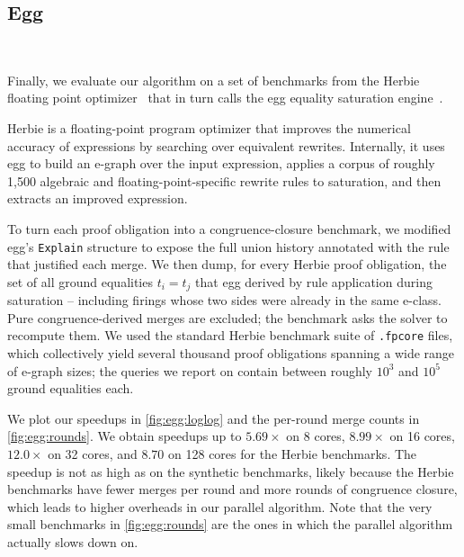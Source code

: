 

\subsection{Egg}~\label{sec:eval:egg}

Finally, we evaluate our algorithm on a set of benchmarks from the Herbie floating point optimizer~\cite{herbie} that in turn calls the egg equality saturation
engine~\cite{egg}.

Herbie is a floating-point program optimizer that improves the numerical
accuracy of expressions by searching over equivalent rewrites. Internally, it
uses egg to build an e-graph over the input expression, applies a corpus of
roughly 1{,}500 algebraic and floating-point-specific rewrite rules to
saturation, and then extracts an improved expression. 

To turn each proof obligation into a congruence-closure benchmark, we modified
egg's \texttt{Explain} structure to expose the full union history annotated
with the rule that justified each merge. We then dump, for every Herbie proof
obligation, the set of all ground equalities $t_i = t_j$ that egg derived by
rule application during saturation -- including firings whose two sides were
already in the same e-class. Pure congruence-derived merges are excluded;
the benchmark asks the solver to recompute them. 
We used the standard
Herbie benchmark suite of \texttt{.fpcore} files, which collectively yield
several thousand proof obligations spanning a wide range of e-graph sizes;
the queries we report on contain between roughly $10^3$ and $10^5$ ground
equalities each.

We plot our speedups in \autoref{fig:egg:loglog} and the per-round merge counts
in \autoref{fig:egg:rounds}.
We obtain speedups up to $5.69\times$ on 8 cores, $8.99\times$ on 16 cores,
$12.0\times$ on 32 cores, and $8.70$ on 128 cores for the Herbie benchmarks. The
speedup is not as high as on the synthetic benchmarks, likely because the Herbie
benchmarks have fewer merges per round and more rounds of congruence closure,
which leads to higher overheads in our parallel algorithm. Note that the very small
benchmarks in \autoref{fig:egg:rounds} are the ones in which the parallel algorithm 
actually slows down on.

